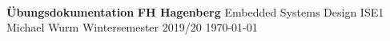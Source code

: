 \thispagestyle{empty} %
\mbox{}\\ \\ \\

\begin{center}

	\LARGE \textbf{  }
	\linebreak
	\linebreak
	\linebreak
	\textbf{\Huge Übungsdokumentation}
	\linebreak
	\linebreak
	\linebreak
	\linebreak
	\linebreak
	\horizontalLine{0.5 mm}
	\linebreak
	\linebreak
	\textbf{\huge \UebungNr}
	\linebreak
	\linebreak
	\linebreak
	\textbf{\LARGE \UebungTopic}
	\linebreak
	\linebreak
	\horizontalLine{0.5 mm}
	\linebreak
	\linebreak
	\linebreak
	\linebreak
	\linebreak
	\linebreak
	\Large {\textbf{FH Hagenberg}}
	\linebreak
	\linebreak
	\Large { Embedded Systems Design }
	\linebreak
	\linebreak
	\Large { ISE1 }
	\linebreak
	\linebreak
	\linebreak
	\linebreak
	\linebreak
	\Large {Michael Wurm}
	\linebreak
	\linebreak
	\linebreak
	\linebreak
	\linebreak
	\normalsize{ Wintersemester 2019/20 }
	\linebreak
	\linebreak
	\large{\today}

\end{center}

